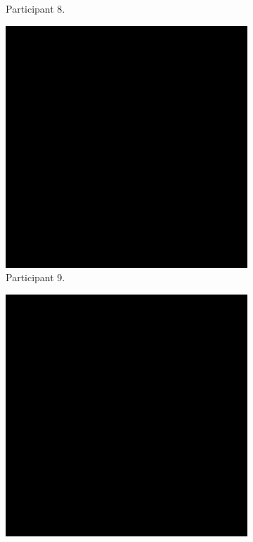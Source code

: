 \begin{figure}[!ht]
\begin{subfigure}[b]{0.24\textwidth}
        \caption{Participant 8.}
    \end{subfigure}
    \hfill    
    \begin{subfigure}[b]{0.24\textwidth}
        \centering
        \includegraphics[width=\textwidth]{img/data/Panel11/single/9.png}
        \caption{Participant 9.}
    \end{subfigure}
    \hfill    
    \begin{subfigure}[b]{0.24\textwidth}
        \centering
        \includegraphics[width=\textwidth]{img/data/Panel11/single/10.png}

\end{subfigure}
\end{figure}
